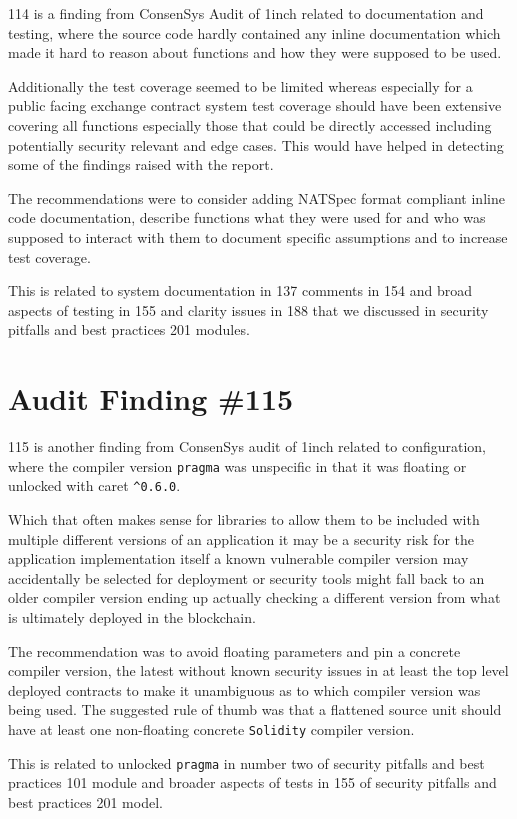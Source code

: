 114 is a finding from ConsenSys Audit of 1inch related to documentation and testing, where the source code hardly contained any inline documentation which made it hard to reason about functions and how they were supposed to be used. 

Additionally the test coverage seemed to be limited whereas especially for a public facing exchange contract system test coverage should have been extensive covering all functions especially those that could be directly accessed including potentially security relevant and edge cases. This would have helped in detecting some of the findings raised with the report.

The recommendations were to consider adding NATSpec format compliant inline code documentation, describe functions what they were used for and who was supposed to interact with them to document specific assumptions and to increase test coverage.

This is related to system documentation in 137 comments in 154 and broad aspects of testing in 155 and clarity issues in 188 that we discussed in security pitfalls and best practices 201 modules.

\section{Audit Finding \#115}

115 is another finding from ConsenSys audit of 1inch related to configuration, where the compiler version \verb|pragma| was unspecific in that it was floating or unlocked with caret  \verb|^0.6.0|. 

Which that often makes sense for libraries to allow them to be included with multiple different versions of an application it may be a security risk for the application implementation itself a known vulnerable compiler version may accidentally be selected for deployment or security tools might fall back to an older compiler version ending up actually checking a different version from what is ultimately deployed in the blockchain.

The recommendation was to avoid floating parameters and pin a concrete compiler version, the latest without known security issues in at least the top level deployed contracts to make it unambiguous as to which compiler version was being used. The suggested rule of thumb was that a flattened source unit should have at least one non-floating concrete \verb|Solidity| compiler version.

This is related to unlocked \verb|pragma| in number two of security pitfalls and best practices 101 module and broader aspects of tests in 155 of security pitfalls and best practices 201 model.

